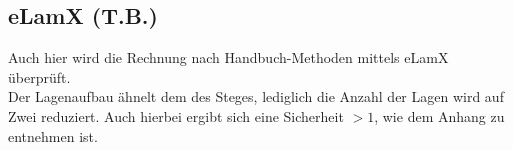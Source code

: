 \subsection{eLamX (T.B.)}

Auch hier wird die Rechnung nach Handbuch-Methoden mittels eLamX überprüft. \\

\noindent Der Lagenaufbau ähnelt dem des Steges, lediglich die Anzahl der Lagen wird auf Zwei reduziert. Auch hierbei ergibt sich eine Sicherheit $>1$, wie dem Anhang zu entnehmen ist.